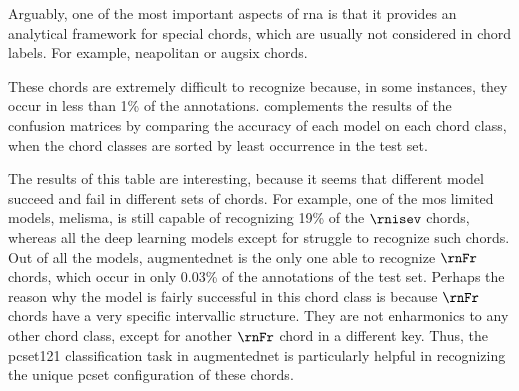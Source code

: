 
Arguably, one of the most important aspects of \gls{rna} is
that it provides an analytical framework for special chords,
which are usually not considered in chord labels. For
example, \gls{neapolitan} or \gls{augsix} chords.

These chords are extremely difficult to recognize because,
in some instances, they occur in less than 1\% of the
annotations.  complements the results of
the confusion matrices by comparing the accuracy of each
model on each chord class, when the chord classes are sorted
by least occurrence in the test set.

The results of this table are interesting, because it seems
that different model succeed and fail in different sets of
chords. For example, one of the mos limited models,
\gls{melisma}, is still capable of recognizing 19\% of the
$\rnisev$ chords, whereas all the deep learning models
except for \textcite{mcleod2021modular} struggle to
recognize such chords. Out of all the models,
\gls{augmentednet} is the only one able to recognize $\rnFr$
chords, which occur in only 0.03\% of the annotations of the
test set. Perhaps the reason why the model is fairly
successful in this chord class is because $\rnFr$ chords
have a very specific intervallic structure. They are not
enharmonics to any other chord class, except for another
$\rnFr$ chord in a different key. Thus, the \gls{pcset121}
classification task in \gls{augmentednet} is particularly
helpful in recognizing the unique \gls{pcset} configuration
of these chords.


